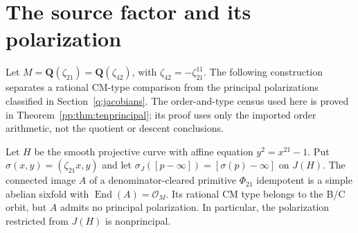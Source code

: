 \section{The source factor and its polarization}
\label{pp:sec:fermatintegral}
Let $M=\mathbf Q(\zeta_{21})=\mathbf Q(\zeta_{42})$, with
$\zeta_{42}=-\zeta_{21}^{11}$. The following construction separates a
rational CM-type comparison from the principal polarizations classified in Section~\ref{q:jacobians}.
The order-and-type census used here is proved in Theorem~\ref{pp:thm:tenprincipal}; its proof uses only the imported order arithmetic, not the quotient or descent conclusions.

\begin{proposition}
Let $H$ be the smooth projective curve with affine equation
$y^2=x^{21}-1$. Put $\sigma(x,y)=(\zeta_{21}x,y)$ and let
$\sigma_J([p-\infty])=[\sigma(p)-\infty]$ on $J(H)$.
The connected image $A$ of a denominator-cleared primitive
$\Phi_{21}$ idempotent is a simple abelian sixfold with
$\operatorname{End}(A)=\mathcal O_M$. Its rational CM type belongs to the
B/C orbit, but $A$ admits no principal polarization. In particular, the
polarization restricted from $J(H)$ is nonprincipal.
\end{proposition}

